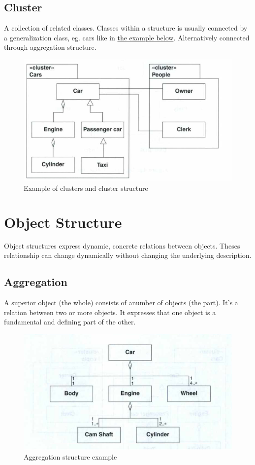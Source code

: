 \subsection*{Cluster}
A collection of related classes. Classes within a structure is usually connected by a generalization class, eg. cars like in \href{fig:structure_cluster_example}{the example below}. Alternatively connected through aggregation structure.
\begin{figure}[H]
    \center
    \includegraphics[width=\linewidth*3/4]{parts/2_problem_domain_analysis/structure/figures/cluster_example.png}
    \caption{Example of clusters and cluster structure \ooad[77]}
    \label{fig:structure_cluster_example}
\end{figure}

\section{Object Structure}
Object structures express dynamic, concrete relations between objects. Theses relationship can change dynamically without changing the underlying description.

\subsection*{Aggregation}
A superior object (the whole) consists of anumber of objects (the part). It's a relation between two or more objects. It expresses that one object is a fundamental and defining part of the other.
\begin{figure}[H]
    \center
    \includegraphics[width=\linewidth*3/4]{parts/2_problem_domain_analysis/structure/figures/aggregation_structure.png}
    \caption{Aggregation structure example \ooad[78]}
    \label{fig:structure_aggregation_example}
\end{figure}
